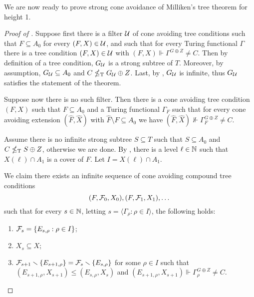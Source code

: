 We are now ready to prove strong cone avoidance of Milliken's tree theorem for height 1.

\begin{proof}[Proof of ]
Suppose first there is a filter $\mathcal{U}$ of cone avoiding tree conditions such that
$F \subseteq A_0$ for every $(F, X) \in \mathcal{U}$, and such that
for every Turing functional $\Gamma$ there is a tree condition $(F, X) \in \mathcal{U}$
with $(F, X) \Vdash \Gamma^{G \oplus Z} \neq C$.
Then by definition of a tree condition, $G_{\mathcal{U}}$ is a strong subtree of $T$.
Moreover, by assumption, $G_{\mathcal{U}} \subseteq A_0$ and $C \nleq_{\text{\upshape T}} G_{\mathcal{U}} \oplus Z$.
Last, by , $G_{\mathcal{U}}$ is infinite, thus $G_{\mathcal{U}}$ satisfies the statement of the theorem.

Suppose now there is no such filter. Then there is a cone avoiding tree condition $(F, X)$
such that $F \subseteq A_0$ and a Turing functional $\Gamma_F$ such that
for every cone avoiding extension $(\hat{F}, \hat{X})$ with $\hat{F} \setminus F \subseteq A_0$ we have $(\hat{F}, \hat{X}) \nVdash \Gamma_F^{G \oplus Z} \neq C$.

Assume there is no infinite strong subtree $S \subseteq T$ such that $S \subseteq A_0$ and $C \nleq_{\text{\upshape T}} S \oplus Z$, otherwise we are done. By , there is a level $\ell \in \mathbb{N}$
such that $X(\ell) \cap A_1$ is a cover of $F$. Let $I = X(\ell) \cap A_1$.

We claim there exists an infinite sequence of cone avoiding compound tree conditions
\[
	(F, \mathcal{F}_0, X_0), (F, \mathcal{F}_1, X_1), \dots
\]
such that for every $s \in \mathbb{N}$, letting $s = \langle \Gamma_\rho: \rho \in I \rangle$, the following holds:
\begin{enumerate}
	\item $\mathcal{F}_s  = \{ E_{s, \rho}: \rho \in I \}$;
	\item $X_s \subseteq X$;
	\item $\mathcal{F}_{s+1} \smallsetminus \{E_{s+1,\rho}\} = \mathcal{F}_s \smallsetminus \{E_{s, \rho}\}$
	for some $\rho \in I$ such that $(E_{s+1, \rho}, X_{s+1}) \leq (E_{s, \rho}, X_s)$
	and  $(E_{s+1, \rho}, X_{s+1}) \Vdash \Gamma_\rho^{G \oplus Z} \neq C$.
\end{enumerate}


\end{proof}
